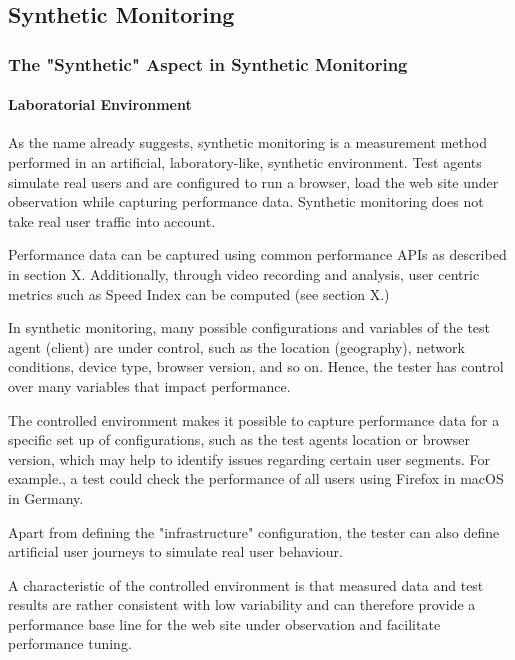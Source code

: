 \subsection{Synthetic Monitoring}


\subsubsection{The "Synthetic" Aspect in Synthetic Monitoring}

\paragraph{Laboratorial Environment}

As the name already suggests, synthetic monitoring is a measurement method performed in an artificial, laboratory-like, synthetic environment.
Test agents simulate real users and are configured to run a browser, load the web site under observation while capturing performance data.
Synthetic monitoring does not take real user traffic into account. %

Performance data can be captured using common performance APIs as described in section X.
Additionally, through video recording and analysis,  user centric metrics such as Speed Index can be computed (see section X.) %

In synthetic monitoring, many possible configurations and variables of the test agent (client) are under control, such as the location (geography), network conditions, device type, browser version, and so on. %
Hence, the tester has control over many variables that impact performance.

The controlled environment makes it possible to capture performance data for a specific set up of configurations, such as the test agents location or browser version, which may help to identify issues regarding certain user segments.  For example., a test could check the performance of all users using Firefox in macOS in Germany. %

Apart from defining the "infrastructure" configuration, the tester can also define artificial user journeys to simulate real user behaviour. %

A characteristic of the controlled environment is that measured data and test results are rather consistent with low variability and can therefore provide a performance base line for the web site under observation and facilitate performance tuning.%


